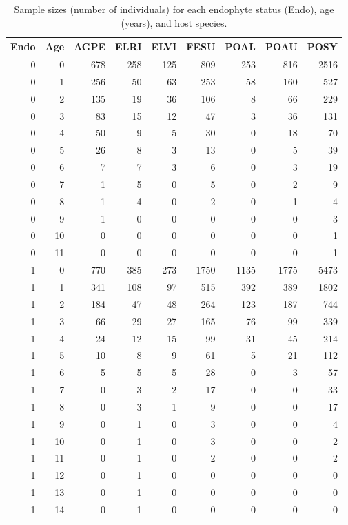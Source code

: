 \documentclass[11pt]{article}
\begin{document}
\renewcommand{\theequation}{A\arabic{equation}}
\renewcommand{\thetable}{A\arabic{table}}
\setcounter{equation}{0}  %
\setcounter{figure}{0}
\setcounter{table}{0}

\begin{table}[ht]
	\centering
	\begin{tabular}{rrrrrrrrr}
		\hline
		Endo & Age & AGPE & ELRI & ELVI & FESU & POAL & POAU & POSY \\ 
		\hline
		0 & 0 & 678 & 258 & 125 & 809 & 253 & 816 & 2516 \\ 
		0 & 1 & 256 & 50 & 63 & 253 & 58 & 160 & 527 \\ 
		0 & 2 & 135 & 19 & 36 & 106 & 8 & 66 & 229 \\ 
		0 & 3 & 83 & 15 & 12 & 47 & 3 & 36 & 131 \\ 
		0 & 4 & 50 & 9 & 5 & 30 & 0 & 18 & 70 \\ 
		0 & 5 & 26 & 8 & 3 & 13 & 0 & 5 & 39 \\ 
		0 & 6 & 7 & 7 & 3 & 6 & 0 & 3 & 19 \\ 
		0 & 7 & 1 & 5 & 0 & 5 & 0 & 2 & 9 \\ 
		0 & 8 & 1 & 4 & 0 & 2 & 0 & 1 & 4 \\ 
		0 & 9 & 1 & 0 & 0 & 0 & 0 & 0 & 3 \\ 
		0 & 10 & 0 & 0 & 0 & 0 & 0 & 0 & 1 \\ 
		0 & 11 & 0 & 0 & 0 & 0 & 0 & 0 & 1 \\ 
		1 & 0 & 770 & 385 & 273 & 1750 & 1135 & 1775 & 5473 \\ 
		1 & 1 & 341 & 108 & 97 & 515 & 392 & 389 & 1802 \\ 
		1 & 2 & 184 & 47 & 48 & 264 & 123 & 187 & 744 \\ 
		1 & 3 & 66 & 29 & 27 & 165 & 76 & 99 & 339 \\ 
		1 & 4 & 24 & 12 & 15 & 99 & 31 & 45 & 214 \\ 
		1 & 5 & 10 & 8 & 9 & 61 & 5 & 21 & 112 \\ 
		1 & 6 & 5 & 5 & 5 & 28 & 0 & 3 & 57 \\ 
		1 & 7 & 0 & 3 & 2 & 17 & 0 & 0 & 33 \\ 
		1 & 8 & 0 & 3 & 1 & 9 & 0 & 0 & 17 \\ 
		1 & 9 & 0 & 1 & 0 & 3 & 0 & 0 & 4 \\ 
		1 & 10 & 0 & 1 & 0 & 3 & 0 & 0 & 2 \\ 
		1 & 11 & 0 & 1 & 0 & 2 & 0 & 0 & 2 \\ 
		1 & 12 & 0 & 1 & 0 & 0 & 0 & 0 & 0 \\ 
		1 & 13 & 0 & 1 & 0 & 0 & 0 & 0 & 0 \\ 
		1 & 14 & 0 & 1 & 0 & 0 & 0 & 0 & 0 \\ 
		\hline
	\end{tabular}
\caption{Sample sizes (number of individuals) for each endophyte status (Endo), age (years), and host species.}
\label{tab:age_n}
\end{table}



\end{document}
